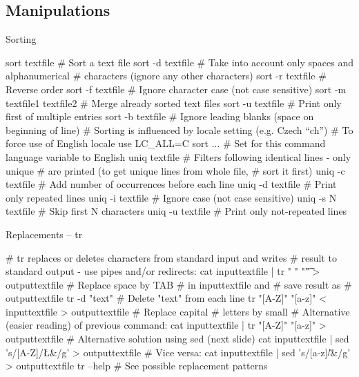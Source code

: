 \documentclass[compress, ucs, xelatex, 11pt, xcolor=svgnames,
  hyperref={
    bookmarks=true,
    unicode=true,
    colorlinks=true,
    pdftitle={Linux, command line and MetaCentrum},
    plainpages=false,
    pdfauthor={Vojtech Zeisek},
    pdfsubject={Course about use of Linux command line, writing shell scripts and using MetaCentrum of CESNET},
    pdfcreator={XeLaTeX},
    pdfkeywords={Linux, GNU, BASH, shell, command line, MetaCentrum},
    linkcolor=Red,
    anchorcolor=Blue,
    citecolor=Purple,
    filecolor=DodgerBlue,
    menucolor=DarkOrchid,
    urlcolor=DeepSkyBlue,
    pdftex},
  url={hyphens, lowtilde} %
  ]{beamer}
\begin{document}
\subsection{Manipulations}

\begin{frame}[fragile]{Sorting}
  \begin{bashcode}
    sort textfile # Sort a text file
    sort -d textfile # Take into account only spaces and alphanumerical
                     # characters (ignore any other characters)
    sort -r textfile # Reverse order
    sort -f textfile # Ignore character case (not case sensitive)
    sort -m textfile1 textfile2 # Merge already sorted text files
    sort -u textfile # Print only first of multiple entries
    sort -b textfile # Ignore leading blanks (space on beginning of line)
    # Sorting is influenced by locale setting (e.g. Czech ``ch'')
    # To force use of English locale use
    LC_ALL=C sort ... # Set for this command language variable to English
    uniq textfile # Filters following identical lines - only unique
                  # are printed (to get unique lines from whole file,
                  # sort it first)
    uniq -c textfile # Add number of occurrences before each line
    uniq -d textfile # Print only repeated lines
    uniq -i textfile # Ignore case (not case sensitive)
    uniq -s N textfile # Skip first N characters
    uniq -u textfile # Print only not-repeated lines
  \end{bashcode}
\end{frame}

\begin{frame}[fragile]{Replacements -- tr}
  \begin{bashcode}
    # tr replaces or deletes characters from standard input and writes
    # result to standard output - use pipes and/or redirects:
    cat inputtextfile | tr " " "\t" > outputtextfile # Replace space by TAB
                                                     # in inputtextfile and
                                                     # save result as
                                                     # outputtextfile
    tr -d "text" # Delete "text" from each line
    tr "[A-Z]" "[a-z]" < inputtextfile > outputtextfile # Replace capital
                                                        # letters by small
    # Alternative (easier reading) of previous command:
    cat inputtextfile | tr "[A-Z]" "[a-z]" > outputtextfile
    # Alternative solution using sed (next slide)
    cat inputtextfile | sed 's/[A-Z]/\L&/g' > outputtextfile # Vice versa:
    cat inputtextfile | sed 's/[a-z]/\U&/g' > outputtextfile
    tr --help # See possible replacement patterns
  \end{bashcode}
\end{frame}
\end{document}
